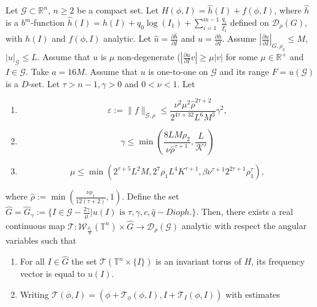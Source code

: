 \begin{theoremB}\label{th:bm_kam}
Let $\mathcal{G} \subset \mathbb{R}^n$, $n\geq 2$ be a compact set.
Let $H(\phi, I) = \hat h (I) + f(\phi,I)$, where $\hat h$ is a $b^m$-function $\hat h (I) = h(I) + q_0 \log(I_1) + \sum_{i=1}^{m-1} \frac{q_i}{I_1^i}$ defined on $\mathcal{D}_\rho(G)$, with $h(I)$ and $f(\phi,I)$ analytic.
Let $\hat u = \frac{\partial \hat h}{\partial I}$ and $u = \frac{\partial h}{\partial I}$.
Assume $|\frac{\partial u}{\partial I}|_{G,\rho_2} \leq M$, $|u|_{\mathcal{G}} \leq L$.
Assume that $u$ is $\mu$ non-degenerate ($|\frac{\partial u}{\partial I}v|\geq \mu|v|$ for some $\mu \in \mathbb{R}^+$ and $I \in \mathcal{G}$. Take $a = 16M$.
Assume that $u$ is one-to-one on $\mathcal{G}$ and its range $F = u(\mathcal{G})$ is a $D$-set.
Let $\tau>n-1,\gamma>0$ and $0 < \nu < 1$. Let
\begin{enumerate}
\item \begin{equation}\label{eq:kam1}
\varepsilon:=\|f\|_{\mathcal{G}, \rho} \leq \frac{\nu^2 \mu^2 \hat \rho^{2\tau+2}}{2^{4\tau+32}L^6M^3} \gamma^2,
\end{equation}
\item \begin{equation}\label{eq:kam2}
\gamma \leq \min(\frac{8LM\rho_2}{\nu \hat \rho^{\tau+1}}, \frac{L}{\mathcal{K}'})
\end{equation}
\item \begin{equation}\label{eq:kam3}
\mu \leq \min(2^{\tau+5}L^2 M,2^7\rho_1 L^4 K^{\tau+1},\beta\nu^{\tau+1}2^{2\tau+1}\rho_1^\tau),
\end{equation}
\end{enumerate}
where $\hat \rho := \min \left(\frac{\nu\rho_1}{12(\tau+2)},1\right)$.
Define the set $\hat G = \hat G_\gamma := \{I \in  \mathcal{G}-\frac{2\gamma}{\mu} | u(I) \text{ is } \tau,\gamma,c,\hat q- Dioph.\}$.
Then, there exists a real continuous map $\mathcal{T}: \mathcal{W}_{\frac{\rho_1}{4}}(\mathbb{T}^n)\times \hat G \rightarrow \mathcal{D}_\rho(\mathcal{G})$ analytic with respect the angular variables such that
\begin{enumerate}
\item\label{kam:point1} For all $I \in \hat G$ the set $\mathcal{T}(\mathbb{T}^n\times \{I\})$ is an invariant torus of $H$, its frequency vector is equal to $u(I)$.
\item\label{kam:point2} Writing $\mathcal{T}(\phi,I)=(\phi + \mathcal{T}_\phi(\phi,I), I + \mathcal{T}_I(\phi,I))$ with estimates


\end{enumerate}
\end{theoremB}
